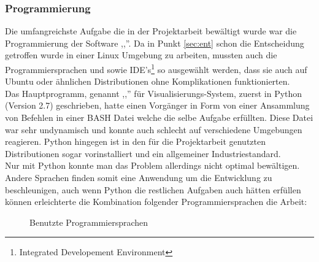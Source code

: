 \subsubsection{Programmierung}
Die umfangreichste Aufgabe die in der Projektarbeit bewältigt wurde
war die Programmierung der Software ,,\vs ''.
Da in Punkt \ref{sec:ent} schon die Entscheidung getroffen wurde in einer Linux Umgebung zu arbeiten,
mussten auch die Programmiersprachen und sowie IDE's\footnote{Integrated Developement Environment}
so ausgewählt werden,
dass sie auch auf Ubuntu oder ähnlichen Distributionen ohne Komplikationen funktionierten.\\
Das Hauptprogramm, genannt ,,\vs '' für Visualisierungs-System, zuerst in
Python (Version 2.7) \cite{python27} geschrieben, hatte einen Vorgänger in Form von einer
Ansammlung von Befehlen in einer BASH Datei welche die selbe Aufgabe erfüllten.
Diese Datei war sehr undynamisch und konnte auch schlecht auf verschiedene
Umgebungen reagieren.
Python hingegen ist in den für die Projektarbeit genutzten Distributionen
sogar vorinstalliert und ein allgemeiner Industriestandard.\\
Nur mit Python konnte man das Problem allerdings nicht optimal bewältigen.
Andere Sprachen finden somit eine Anwendung um die Entwicklung zu beschleunigen,
auch wenn Python die restlichen Aufgaben auch hätten erfüllen können
erleichterte die Kombination folgender Programmiersprachen die Arbeit:
\begin{figure}[H]

\label{fig:pyvi}
\caption{Benutzte Programmiersprachen}
\end{figure}

